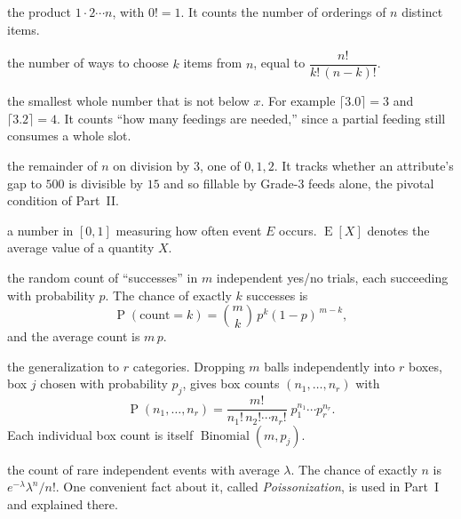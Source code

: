 \documentclass[11pt]{article}
\theoremstyle{remark}
\newcommand{\Prob}{\operatorname{P}}
\newcommand{\Bin}{\operatorname{Binomial}}
\newcommand{\Mult}{\operatorname{Multinomial}}
\newcommand{\Pois}{\operatorname{Poisson}}
\newcommand{\E}{\operatorname{E}}
\begin{document}
\begin{description}[leftmargin=2.2em, style=nextline]
\item[Factorial $n!$] the product $1\cdot 2\cdots n$, with $0!=1$. It counts the
number of orderings of $n$ distinct items.

\item[Binomial coefficient $\binom{n}{k}$] the number of ways to choose $k$ items
from $n$, equal to $\dfrac{n!}{k!\,(n-k)!}$.

\item[Ceiling $\lceil x\rceil$] the smallest whole number that is not below $x$.
For example $\lceil 3.0\rceil=3$ and $\lceil 3.2\rceil=4$. It counts
``how many feedings are needed,'' since a partial feeding still consumes a whole
slot.

\item[Modular residue $n \bmod 3$] the remainder of $n$ on division by $3$, one of
$0,1,2$. It tracks whether an attribute's gap to $500$ is divisible by $15$ and so
fillable by Grade-3 feeds alone, the pivotal condition of Part~II.

\item[Probability $\Prob(E)$] a number in $[0,1]$ measuring how often event $E$
occurs. $\E[X]$ denotes the average value of a quantity $X$.

\item[Binomial distribution $\Bin(m,p)$] the random count of ``successes'' in $m$
independent yes/no trials, each succeeding with probability $p$. The chance of
exactly $k$ successes is
\[
   \Prob(\text{count}=k)=\binom{m}{k}\,p^{k}(1-p)^{\,m-k},
\]
and the average count is $m\,p$.

\item[Multinomial distribution $\Mult(m;\,p_1,\dots,p_r)$] the generalization to
$r$ categories. Dropping $m$ balls independently into $r$ boxes, box $j$ chosen
with probability $p_j$, gives box counts $(n_1,\dots,n_r)$ with
\[
   \Prob(n_1,\dots,n_r)=\frac{m!}{n_1!\,n_2!\cdots n_r!}\;p_1^{n_1}\cdots p_r^{n_r}.
\]
Each individual box count is itself $\Bin(m,p_j)$.

\item[Poisson distribution $\Pois(\lambda)$] the count of rare independent events
with average $\lambda$. The chance of exactly $n$ is $e^{-\lambda}\lambda^{n}/n!$.
One convenient fact about it, called \emph{Poissonization}, is used in Part~I and
explained there.
\end{description}

\end{document}
